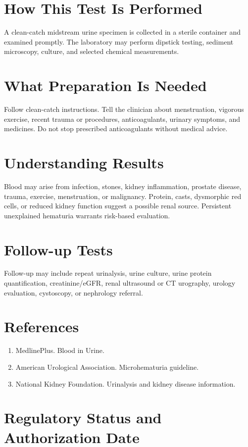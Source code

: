 \section*{How This Test Is Performed}
A clean-catch midstream urine specimen is collected in a sterile container and examined promptly. The laboratory may perform dipstick testing, sediment microscopy, culture, and selected chemical measurements.

\section*{What Preparation Is Needed}
Follow clean-catch instructions. Tell the clinician about menstruation, vigorous exercise, recent trauma or procedures, anticoagulants, urinary symptoms, and medicines. Do not stop prescribed anticoagulants without medical advice.

\section*{Understanding Results}
Blood may arise from infection, stones, kidney inflammation, prostate disease, trauma, exercise, menstruation, or malignancy. Protein, casts, dysmorphic red cells, or reduced kidney function suggest a possible renal source. Persistent unexplained hematuria warrants risk-based evaluation.

\section*{Follow-up Tests}
Follow-up may include repeat urinalysis, urine culture, urine protein quantification, creatinine/eGFR, renal ultrasound or CT urography, urology evaluation, cystoscopy, or nephrology referral.

\section*{References}
\begin{enumerate}
  \item MedlinePlus. Blood in Urine.
  \item American Urological Association. Microhematuria guideline.
  \item National Kidney Foundation. Urinalysis and kidney disease information.
\end{enumerate}

\clearpage


\section*{Regulatory Status and Authorization Date}

\clearpage
